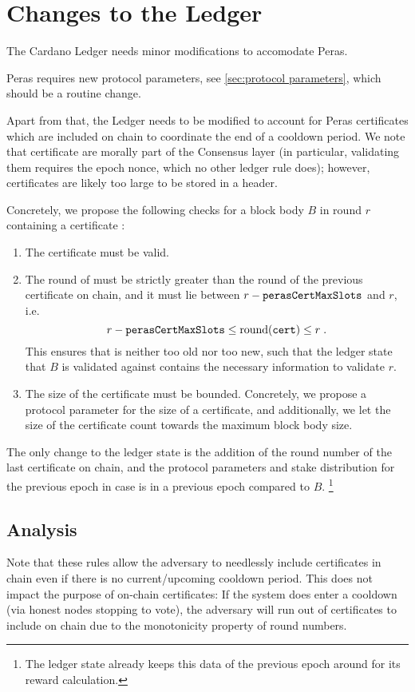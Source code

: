 \section{Changes to the Ledger}\label{sec:ledger changes}

The Cardano Ledger \parencite{shelley-ledger-specs,cardano-formal-ledger-specs} needs minor modifications to accomodate Peras.

Peras requires new protocol parameters, see \cref{sec:protocol parameters}, which should be a routine change.

Apart from that, the Ledger needs to be modified to account for Peras certificates which are included on chain to coordinate the end of a cooldown period.
We note that certificate are morally part of the Consensus layer (in particular, validating them requires the epoch nonce, which no other ledger rule does); however, certificates are likely too large to be stored in a header.

Concretely, we propose the following checks for a block body $B$ in round $r$ containing a certificate \cert{}:
\begin{enumerate}
\item
  The certificate \cert{} must be valid.
\item
  The round of \cert{} must be strictly greater than the round of the previous certificate on chain, and it must lie between $r-\mathtt{perasCertMaxSlots}$ and $r$, i.e.\
  \[ r-\mathtt{perasCertMaxSlots} \le \operatorname{round}(\mathtt{cert}) \le r \;. \]
  This ensures that \cert{} is neither too old nor too new, such that the ledger state that $B$ is validated against contains the necessary information to validate $r$.
\item
  The size of the certificate must be bounded.
  Concretely, we propose a protocol parameter \perasCertSizeLimit{} for the size of a certificate, and additionally, we let the size of the certificate count towards the maximum block body size.
\end{enumerate}
The only change to the ledger state is the addition of the round number of the last certificate on chain, and the protocol parameters and stake distribution for the previous epoch in case \cert{} is in a previous epoch compared to $B$.%
\footnote{The ledger state already keeps this data of the previous epoch around for its reward calculation.}

\subsection{Analysis}
Note that these rules allow the adversary to needlessly include certificates in chain even if there is no current/upcoming cooldown period.
This does not impact the purpose of on-chain certificates:
If the system does enter a cooldown (via honest nodes stopping to vote), the adversary will run out of certificates to include on chain due to the monotonicity property of round numbers.

